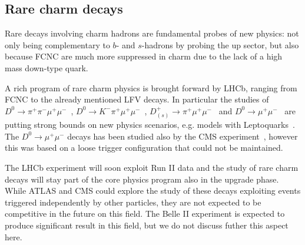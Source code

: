 \subsection{Rare charm decays}

Rare decays involving charm hadrons are fundamental probes of new physics: 
not only being complementary to $b$- and $s$-hadrons by probing the up sector, 
but also because FCNC are much more suppressed in charm due to the lack of a high mass down-type quark. 

A rich program of rare charm physics is brought forward by LHCb, ranging from FCNC to the already mentioned LFV decays. 
In particular the studies of $D^0\to \pi^+ \pi^- \mu^+\mu^-$~\cite{Aaij:2013uoa}, 
$D^0\to K^- \pi^+ \mu^+\mu^-$~\cite{Aaij:2015hva}, $D^+_{(s)}\to \pi^+ \mu^+\mu^-$~\cite{Aaij:2013sua} and $D^0\to \mu^+\mu^-$~\cite{Aaij:2013cza}
are putting strong bounds on new physics scenarios, e.g. models with Leptoquarks~\cite{Bauer:2015knc}.
The $D^0 \to \mu^+ \mu^-$ decays has been studied also by the CMS experiment~\cite{Pedrini:2012vp}, however this was based on a loose trigger
configuration that could not be maintained.

The LHCb experiment will soon exploit Run II data and the study of rare charm decays will stay part of the core physics program
also in the upgrade phase. 
While ATLAS and CMS could explore the study of these decays exploiting events triggered independently by other particles, they are not expected to 
be competitive in the future on this field. 
The Belle II experiment is expected to produce significant result in this field, but we do not discuss futher this aspect here. 

